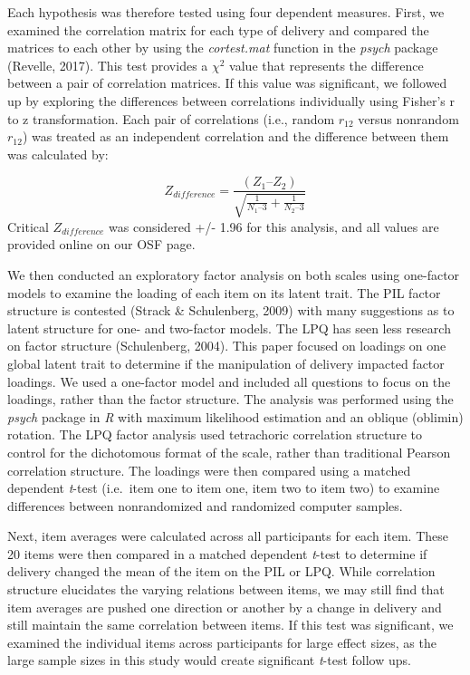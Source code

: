 \documentclass[english,man, mask]{apa6}
\theoremstyle{definition}
\theoremstyle{definition}
\theoremstyle{definition}
\theoremstyle{remark}
\begin{document}
Each hypothesis was therefore tested using four dependent measures.
First, we examined the correlation matrix for each type of delivery and
compared the matrices to each other by using the \emph{cortest.mat}
function in the \emph{psych} package (Revelle, 2017). This test provides
a \(\chi^2\) value that represents the difference between a pair of
correlation matrices. If this value was significant, we followed up by
exploring the differences between correlations individually using
Fisher's r to z transformation. Each pair of correlations (i.e., random
\(r_{12}\) versus nonrandom \(r_{12}\)) was treated as an independent
correlation and the difference between them was calculated by:

\[
Z_{difference} = \frac{(Z_{1} – Z_{2})} { \sqrt{ \frac{1} {N_{1} – 3} + \frac{1} {N_{2} – 3}} }
\] Critical \(Z_{difference}\) was considered +/- 1.96 for this
analysis, and all values are provided online on our OSF page.

We then conducted an exploratory factor analysis on both scales using
one-factor models to examine the loading of each item on its latent
trait. The PIL factor structure is contested (Strack \& Schulenberg,
2009) with many suggestions as to latent structure for one- and
two-factor models. The LPQ has seen less research on factor structure
(Schulenberg, 2004). This paper focused on loadings on one global latent
trait to determine if the manipulation of delivery impacted factor
loadings. We used a one-factor model and included all questions to focus
on the loadings, rather than the factor structure. The analysis was
performed using the \emph{psych} package in \emph{R} with maximum
likelihood estimation and an oblique (oblimin) rotation. The LPQ factor
analysis used tetrachoric correlation structure to control for the
dichotomous format of the scale, rather than traditional Pearson
correlation structure. The loadings were then compared using a matched
dependent \emph{t}-test (i.e.~item one to item one, item two to item
two) to examine differences between nonrandomized and randomized
computer samples.

Next, item averages were calculated across all participants for each
item. These 20 items were then compared in a matched dependent
\emph{t}-test to determine if delivery changed the mean of the item on
the PIL or LPQ. While correlation structure elucidates the varying
relations between items, we may still find that item averages are pushed
one direction or another by a change in delivery and still maintain the
same correlation between items. If this test was significant, we
examined the individual items across participants for large effect
sizes, as the large sample sizes in this study would create significant
\emph{t}-test follow ups.
\end{document}
